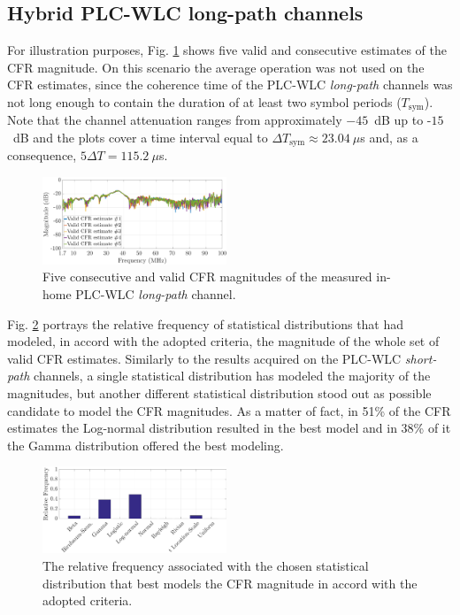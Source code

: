 \documentclass[journal]{IEEEtran}
\begin{document}
\subsection{Hybrid PLC-WLC long-path channels}\label{sec:MMHYBL}

For illustration purposes, Fig. \ref{respfreqlW} shows five valid and consecutive estimates of the \ac{CFR} magnitude. On this scenario the average operation was not used on the \ac{CFR} estimates, since the coherence time of the \ac{PLC}-\ac{WLC} \textit{long-path} channels was not long enough to contain the duration of at least two symbol periods ($T_{\textrm{sym}}$). Note that the channel attenuation ranges from approximately $-45$~dB up to -$15$~dB and the plots cover a time interval equal to $\Delta T_{\textrm{sym}}\approx23.04~\mu$s and, as a consequence, $5\Delta T = 115.2~\mu$s.

\begin{figure}[h]
	\centering
	\includegraphics[width=0.49\textwidth]{images/respfreqlW.eps}
	\caption{Five consecutive and valid CFR magnitudes of the measured in-home PLC-WLC \textit{long-path} channel.}
	\label{respfreqlW}
\end{figure}

Fig. \ref{MAG_percentlW} portrays the relative frequency of statistical distributions that had modeled, in accord with the adopted criteria, the magnitude of the whole set of valid \ac{CFR} estimates. Similarly to the results acquired on the \ac{PLC}-\ac{WLC} \textit{short-path} channels, a single statistical distribution has modeled the majority of the magnitudes, but another different statistical distribution stood out as possible candidate to model the \ac{CFR} magnitudes. As a matter of fact, in 51\% of the \ac{CFR} estimates the Log-normal distribution resulted in the best model and in 38\% of it the Gamma distribution offered the best modeling. 

\begin{figure}[h!]
	\centering
	\includegraphics[width=0.49\textwidth]{images/Mag_percentlW.eps}
	\caption{The relative frequency associated with the chosen statistical distribution that best models the CFR magnitude in accord with the adopted criteria.}
	\label{MAG_percentlW}
\end{figure}
\end{document}

